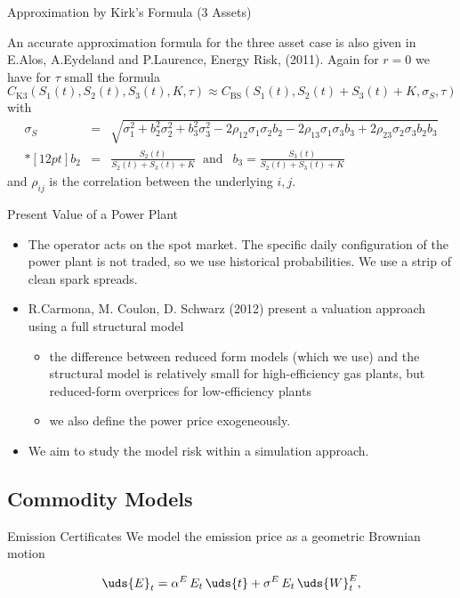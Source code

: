 {Approximation by Kirk's Formula (3 Assets)}

An accurate approximation formula for the three asset case is also given in E.Alos, A.Eydeland and P.Laurence, Energy Risk, (2011). Again for $r=0$ we have for  $\tau$ small the formula
{\small
\begin{equation}
 C_{\mbox{K3}}(S_1(t), S_2(t), S_3(t), K, \tau) \approx
 C_{\mbox{BS}}(S_1(t), S_2(t)+S_3(t)+K, \sigma_S, \tau)
\label{kirk3}
\end{equation}
with
 $$
 \begin{array}{lll}
 \sigma_S & = & \sqrt{\sigma_1^2+b_2^2\sigma_2^2 +b_3^2\sigma_3^2
 - 2\rho_{12}\sigma_1\sigma_2b_2 - 2\rho_{13}\sigma_1\sigma_3b_3 + 2\rho_{23}\sigma_2\sigma_3b_2b_3}\\*[12pt]
 b_2 &=& \frac{S_2(t)}{S_2(t)+S_3(t)+ K}
 \;\;\mbox{and}  \;\;\
  b_3 = \frac{S_3(t)}{S_2(t)+S_3(t) + K}
\end{array}$$
}
and $\rho_{ij}$ is the correlation between the underlying $i,j$.

{Present Value of a Power Plant}
\begin{itemize}
\item<1-> The operator acts on the spot market. The specific daily configuration of the power plant is not traded, so we use historical probabilities. We use a strip of clean spark spreads.
\item<2-> R.Carmona, M. Coulon, D. Schwarz (2012)
present a valuation approach using a full structural model
\begin{itemize}
\item the difference between reduced form models (which we use) and the structural model is relatively small for high-efficiency gas plants, but reduced-form overprices for low-efficiency plants
\item we also define the power price exogeneously.
\end{itemize}
\item<3-> We aim to study the model risk within a simulation approach.
\end{itemize}

\subsection{Commodity Models}

{ Emission Certificates}
We model the emission price as a geometric Brownian motion

\begin{equation}
\uds{E}_t = \alpha^E\,E_t\,\uds{t} + \sigma^E\,E_t\,\uds{W}^E_t,
\label{co2}
\end{equation}

